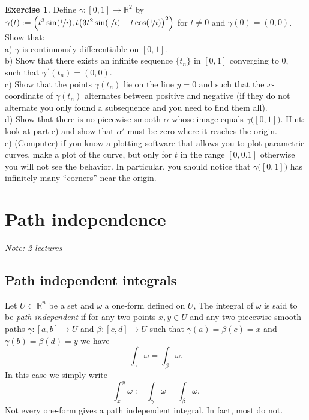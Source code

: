 \documentclass[12pt]{book}
\newcommand{\R}{{\mathbb{R}}}
\newcommand{\myindex}[1]{#1\index{#1}}
\newcommand{\sectionnotes}[1]{\noindent \emph{Note: #1} \medskip \par}
\newcommand{\sectionnewpage}{\clearpage}
\theoremstyle{plain}
\theoremstyle{remark}
\theoremstyle{definition}
\theoremstyle{exercise}
\newtheorem{exercise}{Exercise}[section]
\theoremstyle{example}
\begin{document}
\begin{samepage}
\begin{exercise}
Define $\gamma \colon [0,1] \to \R^2$ by
$\gamma(t) := \Bigl( t^3 \sin(\nicefrac{1}{t}),
t{\bigl(3t^2\sin(\nicefrac{1}{t})-t\cos(\nicefrac{1}{t})\bigr)}^2 \Bigr)$
for
$t \not= 0$ and $\gamma(0) = (0,0)$.  Show that:\\
a) $\gamma$ is continuously differentiable on $[0,1]$.\\
b) Show that there exists an infinite sequence $\{ t_n \}$ in $[0,1]$
converging to 0, such that
$\gamma^{\:\prime}(t_n) = (0,0)$. \\
c) Show that the points $\gamma(t_n)$ lie on the line $y=0$ and such
that the $x$-coordinate of $\gamma(t_n)$ alternates between positive and
negative (if they do not alternate you only found a subsequence
and you need to find them all).\\
d) Show that there is no piecewise smooth $\alpha$ whose image equals
$\gamma\bigl([0,1]\bigr)$.  Hint: look at part c) and show that $\alpha'$
must be zero where it reaches the origin.
\\
e) (Computer) if you know a plotting software that allows you to plot
parametric curves, make a plot of the curve, but only for $t$ in the
range $[0,0.1]$ otherwise you will not see the behavior.  In particular, you
should notice that $\gamma\bigl([0,1]\bigr)$ has infinitely many ``corners''
near the origin.
\end{exercise}
\end{samepage}


\sectionnewpage
\section{Path independence}
\label{sec:pathind}

\sectionnotes{2 lectures}

\subsection{Path independent integrals}

Let $U \subset \R^n$ be a set and $\omega$ a one-form defined on $U$,
The integral of $\omega$
is said to be \emph{\myindex{path independent}}
if for any two points $x,y \in U$ and
any two piecewise smooth paths
$\gamma \colon [a,b] \to U$ and
$\beta \colon [c,d] \to U$ such that $\gamma(a) = \beta(c) = x$
and $\gamma(b) = \beta(d) = y$ we have
\begin{equation*}
\int_\gamma \omega = \int_\beta \omega .
\end{equation*}
In this case we simply write
\begin{equation*}
\int_x^y \omega := \int_\gamma \omega = \int_\beta \omega .
\end{equation*}
Not every one-form gives a path independent integral.  In fact, most do not.
\end{document}
